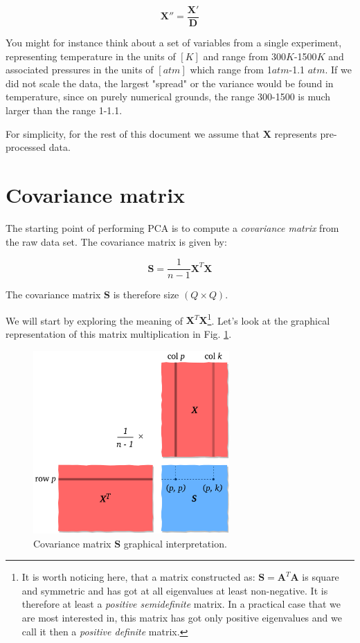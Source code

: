 \documentclass[10pt,twocolumn]{article}
\begin{document}
\begin{equation}
\bm{X''} = \frac{\bm{X'}}{\bm{D}}
\end{equation}

You might for instance think about a set of variables from a single experiment, representing temperature in the units of $[K]$ and range from 300$K$-1500$K$ and associated pressures in the units of $[atm]$ which range from 1$atm$-1.1 $atm$. If we did not scale the data, the largest "spread" or the variance would be found in temperature, since on purely numerical  grounds, the range 300-1500 is much larger than the range 1-1.1.

For simplicity, for the rest of this document we assume that $\bm{X}$ represents pre-processed data.

\section{Covariance matrix}

The starting point of performing PCA is to compute a \textit{covariance matrix} from the raw data set. The covariance matrix is given by:

\begin{equation}
\bm{S} = \frac{1}{n-1} \bm{X}^T \bm{X}
\end{equation}

The covariance matrix $\bm{S}$ is therefore size $(Q \times Q)$.

We will start by exploring the meaning of $\bm{X}^T \bm{X}$\footnote{It is worth noticing here, that a matrix constructed as: $\bm{S} = \bm{A}^T \bm{A}$ is square and symmetric and has got at all eigenvalues at least non-negative. It is therefore at least a \textit{positive semidefinite} matrix. In a practical case that we are most interested in, this matrix has got only positive eigenvalues and we call it then a \textit{positive definite} matrix.}. Let's look at the graphical representation of this matrix multiplication in Fig. \ref{fig:covariance-matrix}.

\begin{figure}[H]
\centering\includegraphics[width=7.5cm]{cov-matrix.png}
\caption{Covariance matrix $\bm{S}$ graphical interpretation.}
\label{fig:covariance-matrix}
\end{figure}
\end{document}
